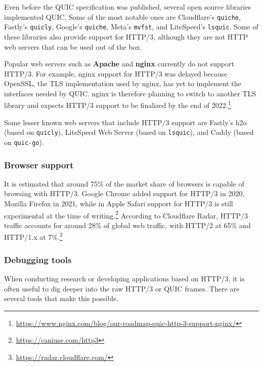 Even before the QUIC specification was published, several open source libraries implemented QUIC. Some of the most notable ones are Cloudflare's \texttt{quiche}, Fastly's \texttt{quicly}, Google's \texttt{quiche}, Meta's \texttt{mvfst}, and LiteSpeed's \texttt{lsquic}.\cite{quicdiversity} Some of these libraries also provide support for HTTP/3, although they are not HTTP web servers that can be used out of the box.

Popular web servers such as \textbf{Apache} and \textbf{nginx} currently do not support HTTP/3. For example, nginx support for HTTP/3 was delayed because OpenSSL, the TLS implementation used by nginx, has yet to implement the interfaces needed by QUIC. nginx is therefore planning to switch to another TLS library and expects HTTP/3 support to be finalized by the end of 2022.\footnote{\url{https://www.nginx.com/blog/our-roadmap-quic-http-3-support-nginx/}}

Some lesser known web servers that include HTTP/3 support are Fastly's h2o (based on \texttt{quicly}), LiteSpeed Web Server (based on \texttt{lsquic}), and Caddy (based on \texttt{quic-go}).

\subsubsection{Browser support}
\label{sec:bg/http3/browsers}

It is estimated that around 75\% of the market share of browsers is capable of browsing with HTTP/3. Google Chrome added support for HTTP/3 in 2020, Mozilla Firefox in 2021, while in Apple Safari support for HTTP/3 is still experimental at the time of writing.\footnote{\url{https://caniuse.com/http3}} According to Cloudflare Radar, HTTP/3 traffic accounts for around 28\% of global web traffic, with HTTP/2 at 65\% and HTTP/1.x at 7\%.\footnote{\url{https://radar.cloudflare.com/}}

\subsubsection{Debugging tools}
\label{sec:bg/http3/tools}

When conducting research or developing applications based on HTTP/3, it is often useful to dig deeper into the raw HTTP/3 or QUIC frames. There are several tools that make this possible.


